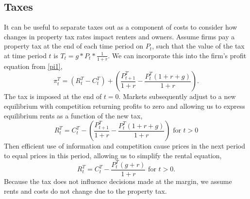 \documentclass[ecta,nameyear,draft]{econsocart}
\theoremstyle{plain}
\theoremstyle{remark}
\begin{document}
%



\subsection{Taxes}
It can be useful to separate taxes out as a component of costs to consider how changes in property tax rates impact renters and owners. Assume firms pay a property tax at the end of each time period on $P_{t}$, such that the value of the tax at time period $t$ is $T_t=g*P_{t}*\frac{1}{1+r}$. We can incorporate this into the firm's profit equation from \ref{pi1},
\begin{equation*}
	\pi^T_t = (R^T_t-C^T_t)+\left(\frac{P^T_{t+1}}{1+r}-\frac{P^T_t(1+r+g)}{1+r}\right).\label{pi1T}
\end{equation*}
The tax is imposed at the end of $t=0$. Markets subsequently adjust to a new equilibrium with competition returning profits to zero and allowing us to express equilibrium rents as a function of the new tax,
\begin{equation*}
	R^T_t=C^T_t-\left(\frac{P^T_{t+1}}{1+r}-\frac{P^T_t(1+r+g)}{1+r}\right) \text{ for }t>0
\end{equation*}
Then efficient use of information and competition cause prices in the next period to equal prices in this period, allowing us to simplify the rental equation,
\begin{equation*}
R^T_t=C^T_t-\frac{P^T_{t}(g+r)}{1+r}\text{ for }t>0.
\end{equation*}
Because the tax does not influence decisions made at the margin, we assume rents and costs do not change due to the property tax. 
\end{document}
